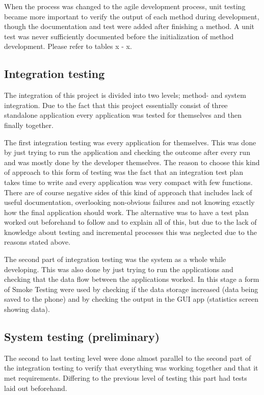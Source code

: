 When the process was changed to the agile development process, unit testing became more important to verify the output of each method during development, though the documentation and test were added after finishing a method. A unit test was never sufficiently documented before the initialization of method development. Please refer to tables x - x.
\subsection{Integration testing}
The integration of this project is divided into two levels; method- and system integration. Due to the fact that this project essentially consist of three standalone application every application was tested for themselves and then finally together.

The first integration testing was every application for themselves. This was done by just trying to run the application and checking the outcome after every run and was mostly done by the developer themselves. The reason to choose this kind of approach to this form of testing was the fact that an integration test plan takes time to write and every application was very compact with few functions. There are of course negative sides of this kind of approach that includes lack of useful documentation, overlooking non-obvious failures and not knowing exactly how the final application should work. The alternative was to have a test plan worked out beforehand to follow and to explain all of this, but due to the lack of knowledge about testing and incremental processes this was neglected due to the reasons stated above.

The second part of integration testing was the system as a whole while developing. This was also done by just trying to run the applications and checking that the data flow between the applications worked. In this stage a form of Smoke Testing were used by checking if the data storage increased (data being saved to the phone) and by checking the output in the GUI app (statistics screen showing data).
\subsection{System testing (preliminary)}
The second to last testing level were done almost parallel to the second part of the integration testing to verify that everything was working together and that it met requirements. Differing to the previous level of testing this part had tests laid out beforehand.

